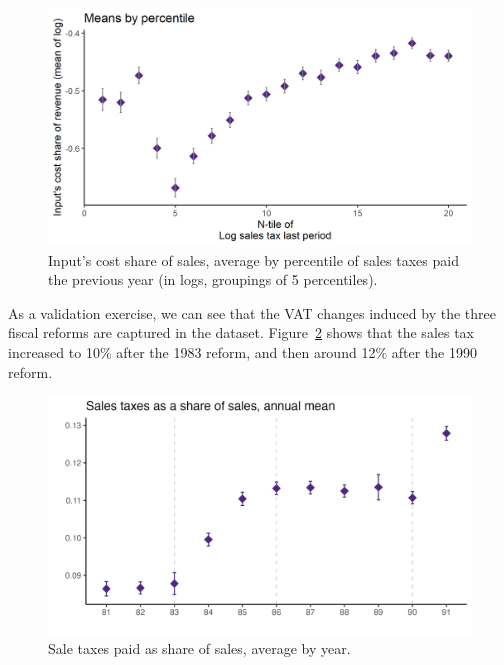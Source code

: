 \documentclass[
  12pt]{article}
\theoremstyle{definition}
\theoremstyle{remark}
\begin{document}
\begin{figure}

{\centering \includegraphics[width=1\textwidth,height=\textheight]{../Results/Figures/Colombia/select_disc_lag_log_sales_tax_20.png}

}

\caption{\label{fig-ls-ntax}Input's cost share of sales, average by
percentile of sales taxes paid the previous year (in logs, groupings of
5 percentiles).}

\end{figure}

As a validation exercise, we can see that the VAT changes induced by the
three fiscal reforms are captured in the dataset. Figure~\ref{fig-vat}
shows that the sales tax increased to 10\% after the 1983 reform, and
then around 12\% after the 1990 reform.

\begin{figure}

{\centering \includegraphics[width=1\textwidth,height=\textheight]{../Results/Figures/Colombia/share_sales_tax_byy.png}

}

\caption{\label{fig-vat}Sale taxes paid as share of sales, average by
year.}

\end{figure}
\end{document}
